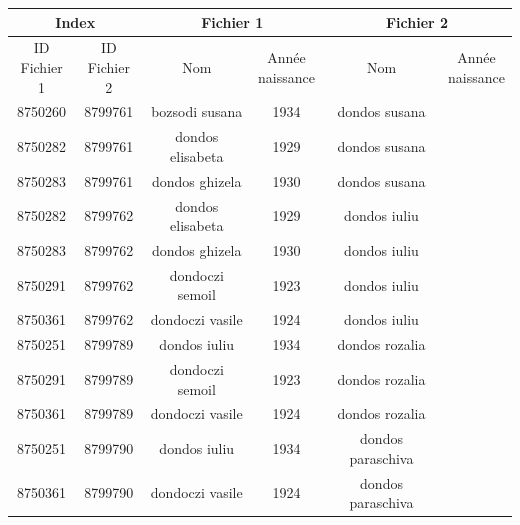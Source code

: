 \documentclass[a4paper,12pt,twoside]{book}
\begin{document}
	            \begin{table}[htbp]
    	            \centering
                    \renewcommand\cellalign{cl}
    			        \begin{tabular}{|c|c|c|c|c|c|}
    			        \hline
			            \multicolumn{2}{|c|}{Index}&\multicolumn{2}{|c|}{Fichier 1}&\multicolumn{2}{|c|}{Fichier 2}\\\hline
			            \Centerstack{ID\\Fichier 1} & \Centerstack{ID\\Fichier 2} & Nom & \Centerstack{Année\\naissance} & Nom & \Centerstack{Année\\naissance} \\\hline
                        8750260 & 8799761 & bozsodi susana & 1934 & dondos susana &  \\
                        8750282 & 8799761 & dondos elisabeta & 1929 & dondos susana &  \\
                        8750283 & 8799761 & dondos ghizela & 1930 & dondos susana &  \\
                        8750282 & \cellcolor{red}8799762 & dondos elisabeta & 1929 & dondos iuliu &  \\
                        8750283 & \cellcolor{red}8799762 & dondos ghizela & 1930 & dondos iuliu &  \\
                        8750291 & \cellcolor{red}8799762 & dondoczi semoil & 1923 & dondos iuliu &  \\
                        8750361 & \cellcolor{red}8799762 & dondoczi vasile & 1924 & dondos iuliu &  \\
                        8750251 & 8799789 & dondos iuliu & 1934 & dondos rozalia &  \\
                        8750291 & 8799789 & dondoczi semoil & 1923 & dondos rozalia &  \\
                        8750361 & 8799789 & dondoczi vasile & 1924 & dondos rozalia &  \\
                        8750251 & 8799790 & dondos iuliu & 1934 & dondos paraschiva &  \\
                        8750361 & 8799790 & dondoczi vasile & 1924 & dondos paraschiva &  \\

\end{tabular}
\end{table}
\end{document}
